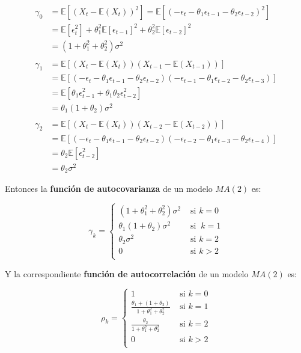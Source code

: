 \documentclass[
  a4paper,
  oneside,
  openany]{book}
\begin{document}
\[
\begin{split}
\gamma_0 & = \mathbb{E}\left[(X_{t}-\mathbb{E}(X_{t}))^2\right]=\mathbb{E}\left[(-\epsilon_t-\theta_1\epsilon_{t-1}-\theta_2\epsilon_{t-2})^2\right]\\
& = \mathbb{E}\left[\epsilon_t^2\right]+\theta_1^2\mathbb{E}\left[\epsilon_{t-1}\right]^2+\theta_2^2\mathbb{E}\left[\epsilon_{t-2}\right]^2\\
& = \left(1+\theta_1^2+\theta_2^2\right)\sigma^2\\
\\
\gamma_1 & = \mathbb{E}\left[(X_{t}-\mathbb{E}(X_{t}))(X_{t-1}-\mathbb{E}(X_{t-1}))\right]\\
& = \mathbb{E}\left[(-\epsilon_t-\theta_1\epsilon_{t-1}-\theta_2\epsilon_{t-2})(-\epsilon_{t-1}-\theta_1\epsilon_{t-2}-\theta_2\epsilon_{t-3})\right]\\
& = \mathbb{E}\left[\theta_1\epsilon_{t-1}^2+\theta_1\theta_2\epsilon_{t-2}^2\right]\\
& = \theta_1\left(1+\theta_2\right)\sigma^2\\
\\
\gamma_2 & = \mathbb{E}\left[(X_{t}-\mathbb{E}(X_{t}))(X_{t-2}-\mathbb{E}(X_{t-2}))\right]\\
& = \mathbb{E}\left[(-\epsilon_t-\theta_1\epsilon_{t-1}-\theta_2\epsilon_{t-2})(-\epsilon_{t-2}-\theta_1\epsilon_{t-3}-\theta_2\epsilon_{t-4})\right]\\
& = \theta_2\mathbb{E}\left[\epsilon_{t-2}^2\right]\\
& = \theta_2\sigma^2
\end{split}
\]

Entonces la \textbf{función de autocovarianza} de un modelo \(MA(2)\) es:

\[
\gamma_k = \left\{
\begin{array}{lr}
\left(1+\theta_1^2+\theta_2^2\right)\sigma^2 & \mbox{ si } k=0\\
\theta_1(1+\theta_2) \sigma^2 & \mbox{ si }\ k=1\\
\theta_2 \sigma^2 & \mbox{ si } k=2\\
0 & \mbox{ si } k>2\\
\end{array}
\right.
\]

Y la correspondiente \textbf{función de autocorrelación} de un modelo \(MA(2)\) es:

\[
\rho_k = \left\{
\begin{array}{lr}
1 &  \mbox{ si } k=0\\
\frac{\theta_1+(1+\theta_2)}{1+\theta_1^2+\theta_2^2}&  \mbox{ si } k=1\\
\frac{\theta_2}{1+\theta_1^2+\theta_2^2}&  \mbox{ si } k=2\\
0 &  \mbox{ si }  k>2\\
\end{array}
\right.
\]
\end{document}
